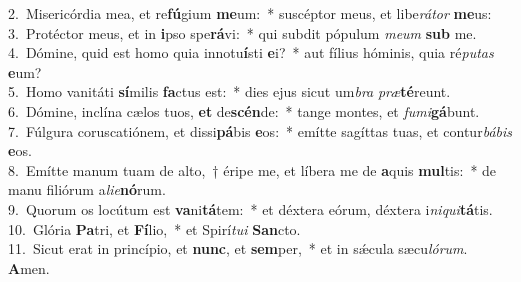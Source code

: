 {2.~}Misericórdia mea, et re\textbf{fú}gium \textbf{me}um:~* suscéptor meus, et libe\textit{rá}\textit{tor} \textbf{me}us:\\
{3.~}Protéctor meus, et in \textbf{i}pso spe\textbf{rá}vi:~* qui subdit pópulum \textit{me}\textit{um} \textbf{sub} me.\\
{4.~}Dómine, quid est homo quia innotu\textbf{í}sti \textbf{e}i?~* aut fílius hóminis, quia ré\textit{pu}\textit{tas} \textbf{e}um?\\
{5.~}Homo vanitáti \textbf{sí}milis \textbf{fa}ctus est:~* dies ejus sicut um\textit{bra} \textit{præ}\textbf{té}reunt.\\
{6.~}Dómine, inclína cælos tuos, \textbf{et} de\textbf{scén}de:~* tange montes, et \textit{fu}\textit{mi}\textbf{gá}bunt.\\
{7.~}Fúlgura coruscatiónem, et dissi\textbf{pá}bis \textbf{e}os:~* emítte sagíttas tuas, et contur\textit{bá}\textit{bis} \textbf{e}os.\\
{8.~}Emítte manum tuam de alto,~† éripe me, et líbera me de \textbf{a}quis \textbf{mul}tis:~* de manu filiórum a\textit{li}\textit{e}\textbf{nó}rum.\\
{9.~}Quorum os locútum est \textbf{va}ni\textbf{tá}tem:~* et déxtera eórum, déxtera i\textit{ni}\textit{qui}\textbf{tá}tis.\\
{10.~}Glória \textbf{Pa}tri, et \textbf{Fí}lio,~* et Spirí\textit{tu}\textit{i} \textbf{San}cto.\\
{11.~}Sicut erat in princípio, et \textbf{nunc}, et \textbf{sem}per,~* et in sǽcula sæcu\textit{ló}\textit{rum}. \textbf{A}men.\\
